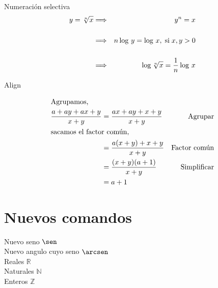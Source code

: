 \documentclass{article} %
\newcommand{\R}{\mathbb{R}}
\newcommand{\N}{\mathbb{N}}
\newcommand{\Z}{\mathbb{Z}}
\begin{document}
Numeración selectiva
\begin{eqnarray}
    y=\sqrt[n]{x} &\Longrightarrow &y^n = x \nonumber\\[0.5cm]
    &\Longrightarrow &n\log \,y=\log\,x,
    \;\mbox{si}\; x,y>0 \\[0.5cm]
    &\Longrightarrow &\log \sqrt[n]{x}={1 \over n}\log \,x
\end{eqnarray}

Align

\begin{align*}
    \intertext{Agrupamos,}
    \frac{a+ay+ax+y}{x+y} &= \frac{ax+ay+x+y}{x+y} &\mbox{Agrupar}\\
    \intertext{sacamos el factor común,}
    &= \frac{a(x+y)+x+y}{x+y} &\mbox{Factor común}\\
    &= \frac{(x+y)(a+1)}{x+y} &\mbox{Simplificar}\\
    &= a+1
\end{align*}

\section{Nuevos comandos}

Nuevo seno
$\sen$ \\
Nuevo angulo cuyo seno
$\arcsen$ \\ 
Reales
$\R$ \\
Naturales
$\N$ \\
Enteros
$\Z$ \\
\end{document}
